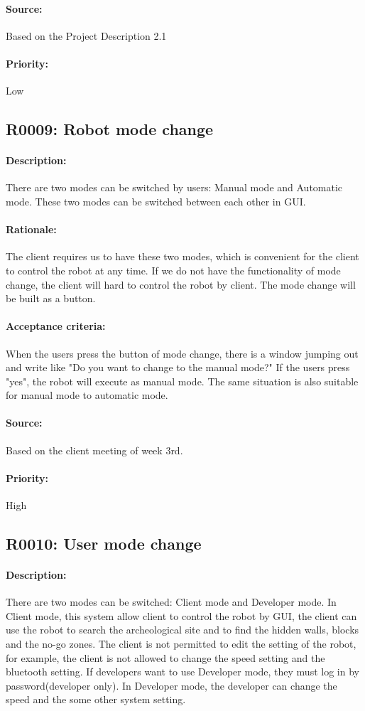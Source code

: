 \documentclass[11pt, a4paper]{report}
\begin{document}
\paragraph{Source:}
Based on the Project Description 2.1
\paragraph{Priority:}
Low



\subsection{R0009: Robot mode change}
\paragraph{Description:}
There are two modes can be switched by users: Manual mode and Automatic mode. These two modes can be switched between each other in GUI. \paragraph{Rationale:}
The client requires us to have these two modes, which is convenient for the client to control the robot at any time. If we do not have the functionality of mode change, the client will hard to control the robot by client. The mode change will be built as a button.
\paragraph{Acceptance criteria:}
When the users press the button of mode change, there is a window jumping out and write like "Do you want to change to the manual mode?" If the users press "yes", the robot will execute as manual mode. The same situation is also suitable for manual mode to automatic mode.
\paragraph{Source:}
Based on the client meeting of week 3rd.
\paragraph{Priority:}
High 


\subsection{R0010: User mode change}
\paragraph{Description:}
There are two modes can be switched: Client mode and Developer mode. In Client mode, this system allow client to control the robot by GUI, the client can use the robot to search the archeological site and to find the hidden walls, blocks and the no-go zones. The client is not permitted to edit the setting of the robot, for example, the client is not allowed to change the speed setting and the bluetooth setting. If developers want to use Developer mode, they must log in by password(developer only). In Developer mode, the developer can change the speed and the some other system setting.
\end{document}
